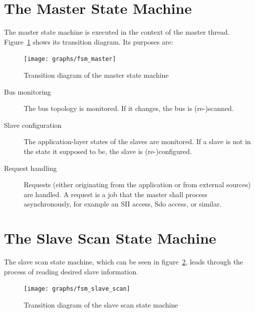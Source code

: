 \documentclass[a4paper,12pt,BCOR6mm,bibtotoc,idxtotoc]{scrbook}
\begin{document}

\section{The Master State Machine}
\label{sec:fsm-master}

The master state machine is executed in the context of the master thread.
Figure~\ref{fig:fsm-master} shows its transition diagram. Its purposes are:

\begin{figure}[htbp]
  \centering
  \texttt{[image: graphs/fsm\_master]}
  \caption{Transition diagram of the master state machine}
  \label{fig:fsm-master}
\end{figure}

\begin{description}

\item[Bus monitoring] The bus topology is monitored. If it changes, the bus is
(re-)scanned.

\item[Slave configuration] The application-layer states of the slaves are
monitored. If a slave is not in the state it supposed to be, the slave is
(re-)configured.

\item[Request handling] Requests (either originating from the application or
from external sources) are handled. A request is a job that the master shall
process asynchronously, for example an SII access, Sdo access, or similar.

\end{description}


\section{The Slave Scan State Machine}
\label{sec:fsm-scan}

The slave scan state machine, which can be seen in
figure~\ref{fig:fsm-slavescan}, leads through the process of reading desired
slave information.

\begin{figure}[htbp]
  \centering
  \texttt{[image: graphs/fsm\_slave\_scan]}
  \caption{Transition diagram of the slave scan state machine}
  \label{fig:fsm-slavescan}
\end{figure}
\end{document}
